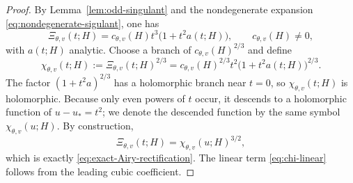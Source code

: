 \documentclass[11pt]{article}
\numberwithin{equation}{section}
\theoremstyle{definition}
\begin{document}
\begin{proof}
By Lemma~\ref{lem:odd-singulant} and the nondegenerate expansion \eqref{eq:nondegenerate-sigulant}, one has
\begin{equation}
\label{eq:Xi-cubic}
 \Xi_{\theta,v}(t;H)=c_{\theta,v}(H)t^3\bigl(1+t^2 a(t;H)\bigr),
 \qquad c_{\theta,v}(H)\neq 0,
\end{equation}
with $a(t;H)$ analytic. Choose a branch of $c_{\theta,v}(H)^{2/3}$ and define
\begin{equation}
\label{eq:chi-t-def}
 \chi_{\theta,v}(t;H):=\Xi_{\theta,v}(t;H)^{2/3}
 =c_{\theta,v}(H)^{2/3}t^2\bigl(1+t^2 a(t;H)\bigr)^{2/3}.
\end{equation}
The factor $(1+t^2a)^{2/3}$ has a holomorphic branch near $t=0$, so $\chi_{\theta,v}(t;H)$ is holomorphic. Because only even powers of $t$ occur, it descends to a holomorphic function of $u-u_*=t^2$; we denote the descended function by the same symbol $\chi_{\theta,v}(u;H)$. By construction,
\[
\Xi_{\theta,v}(t;H)=\chi_{\theta,v}(u;H)^{3/2},
\]
which is exactly \eqref{eq:exact-Airy-rectification}. The linear term \eqref{eq:chi-linear} follows from the leading cubic coefficient.
\end{proof}
\end{document}

